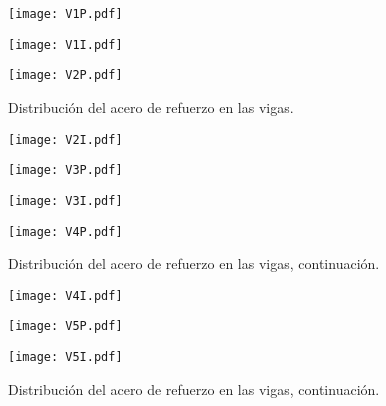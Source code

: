 \begin{figure}[htbp]
        \texttt{[image: V1P.pdf]}						
	\label{fig:apendis1}																													
\end{figure}

\begin{figure}[htbp]
        \texttt{[image: V1I.pdf]}					
	\label{fig:apendis2}																													
\end{figure}

\begin{figure}[htbp]
        \texttt{[image: V2P.pdf]}									
	\caption{Distribuci\'on del acero de refuerzo en las vigas.}
	\label{fig:apendis3}																													
\end{figure}

\begin{figure}[htbp]
        \texttt{[image: V2I.pdf]}	
	\label{fig:apendis4}																															
\end{figure}

\begin{figure}[htbp]
        \texttt{[image: V3P.pdf]}
	\label{fig:apendis5}																															
\end{figure}

\begin{figure}[htbp]
        \texttt{[image: V3I.pdf]}
	\label{fig:apendis6}																															
\end{figure}

\begin{figure}[htbp]
        \texttt{[image: V4P.pdf]}
	\caption{Distribuci\'on del acero de refuerzo en las vigas, continuaci\'on.}
	\label{fig:apendis7}																															
\end{figure}

\begin{figure}[htbp]
        \texttt{[image: V4I.pdf]}	
	\label{fig:apendis8}																															
\end{figure}

\begin{figure}[htbp]
        \texttt{[image: V5P.pdf]}
	\label{fig:apendis9}
\end{figure}

\begin{figure}[htbp]
        \texttt{[image: V5I.pdf]}																												
	\caption{Distribuci\'on del acero de refuerzo en las vigas, continuaci\'on.}
	\label{fig:apendis10}
\end{figure}

